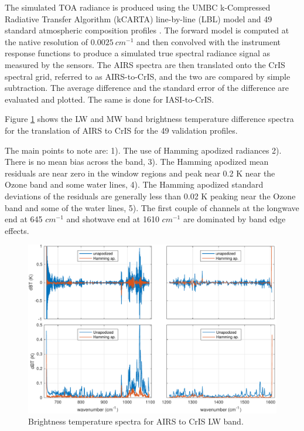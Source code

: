 \documentclass[twocolumn,10pt]{article}
\begin{document}
The simulated TOA radiance is produced using the UMBC k-Compressed Radiative Transfer Algorithm (kCARTA) line-by-line (LBL) model \cite{kcarta1998} and 49 standard atmospheric composition profiles \cite{TIGR1998}. The forward model is computed at the native resolution of $0.0025\ cm^{-1}$ and then convolved with the instrument response functions to produce a simulated true spectral radiance signal as measured by the sensors. The AIRS spectra are then translated onto the CrIS spectral grid, referred to as AIRS-to-CrIS, and the two are compared by simple subtraction. The average difference and the standard error of the difference are evaluated and plotted. The same is done for IASI-to-CrIS. 

Figure \ref{fig:1a} shows the LW and MW band brightness temperature difference spectra for the translation of AIRS to CrIS for the 49 validation profiles.

The main points to note are: 1). The use of Hamming apodized radiances 2). There is no mean bias across the band, 3). The Hamming apodized mean residuals are near zero in the window regions and peak near 0.2 K near the Ozone band and some water lines, 4). The Hamming apodized standard deviations of the residuals are generally less than 0.02 K peaking near the Ozone band and some of the water lines, 5). The first couple of channels at the longwave end at 645 $cm^{-1}$ and shotwave end at 1610 $cm^{-1}$ are dominated by band edge effects.

\begin{figure}[htb]
\centering
\includegraphics[width=\linewidth]{./figs/airs2cris_validation_LW_MW.pdf}
\caption{
  Brightness temperature spectra for AIRS to CrIS LW band.}
\label{fig:1a}
\end{figure}
\end{document}
